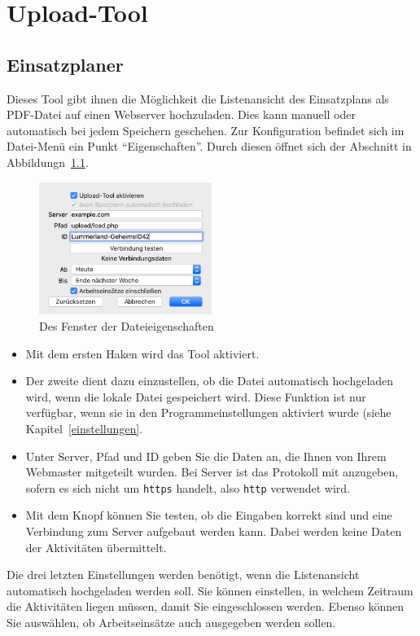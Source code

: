 \chapter{Upload-Tool}\label{upload}
\section{Einsatzplaner}\label{upload:client}
Dieses Tool gibt ihnen die Möglichkeit die Listenansicht des Einsatzplans als PDF-Datei auf einen Webserver hochzuladen.
Dies kann manuell oder automatisch bei jedem Speichern geschehen.
Zur Konfiguration befindet sich im Datei-Menü ein Punkt "`Eigenschaften"'.
Durch diesen öffnet sich der Abschnitt in Abbildungn~\ref{fig:uploadtool}.
\begin{figure}[!h]
  \centering
	\includegraphics[width=0.5\textwidth]{img/eigenschaften_upload}
	\caption{Des Fenster der Dateieigenschaften}
	\label{fig:uploadtool}
\end{figure}
\begin{itemize}
  \item
  Mit dem ersten Haken wird das Tool aktiviert.
  \item
  Der zweite dient dazu einzustellen, ob die Datei automatisch hochgeladen wird, wenn die lokale Datei gespeichert wird.
  Diese Funktion ist nur verfügbar, wenn sie in den Programmeinstellungen aktiviert wurde (siehe Kapitel~\ref{einstellungen}.
  \item
  Unter Server, Pfad und ID geben Sie die Daten an, die Ihnen von Ihrem Webmaster mitgeteilt wurden.
  Bei Server ist das Protokoll mit anzugeben, sofern es sich nicht um \texttt{https} handelt, also \texttt{http} verwendet wird.
  \item
  Mit dem Knopf können Sie testen, ob die Eingaben korrekt sind und eine Verbindung zum Server aufgebaut werden kann.
  Dabei werden keine Daten der Aktivitäten übermittelt.
\end{itemize}
Die drei letzten Einstellungen werden benötigt, wenn die Listenansicht automatisch hochgeladen werden soll.
Sie können einstellen, in welchem Zeitraum die Aktivitäten liegen müssen, damit Sie eingeschlossen werden.
Ebenso können Sie auswählen, ob Arbeitseinsätze auch ausgegeben werden sollen.

